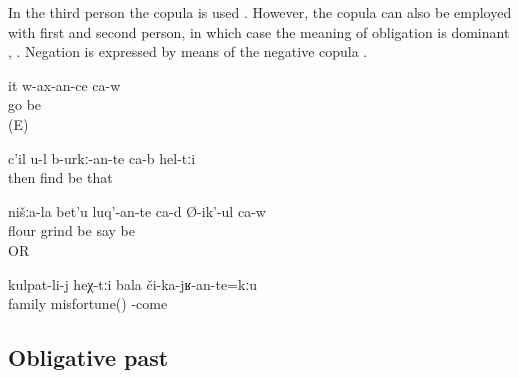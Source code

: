 In the third person the copula is used . However, the copula can also be employed with first and second person, in which case the meaning of obligation is dominant , . Negation is expressed by means of the negative copula .
%
\begin{exe}
	\ex	\label{ex:He will go / have to go E}
	\gll	it	w-ax-an-ce	ca-w\\
			go	be\\
	\glt	{} (E)

	\ex	\label{ex:Then you have to find them analytic}
	\gll	c'il	u-l	b-urkː-an-te	ca-b	hel-tːi\\
		then		find 	be	that\\
	\glt	{}

	\ex	\label{ex:Our flour we should / (will) grind, he says analytic}
	\gll	nišːa-la	bet'u	luq'-an-te ca-d	Ø-ik'-ul	ca-w\\
			flour	grind 	be	say	be\\
	\glt	{} OR 

	\ex	\label{ex:‎To a family such misfortune should not happen analytic}
	\gll	kulpat-li-j	heχ-tːi	bala	či-ka-jʁ-an-te=kːu\\
		family		misfortune()	-come\\
	\glt	{}
\end{exe}



\subsection{Obligative past}
\label{ssec:Obligative past}

